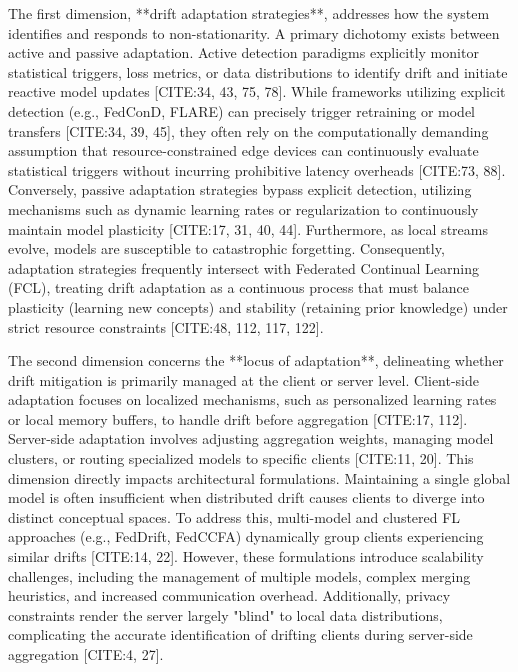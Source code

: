 \documentclass[journal]{IEEEtran}
\begin{document}
The first dimension, **drift adaptation strategies**, addresses how the system identifies and responds to non-stationarity. A primary dichotomy exists between active and passive adaptation. Active detection paradigms explicitly monitor statistical triggers, loss metrics, or data distributions to identify drift and initiate reactive model updates [CITE:34, 43, 75, 78]. While frameworks utilizing explicit detection (e.g., FedConD, FLARE) can precisely trigger retraining or model transfers [CITE:34, 39, 45], they often rely on the computationally demanding assumption that resource-constrained edge devices can continuously evaluate statistical triggers without incurring prohibitive latency overheads [CITE:73, 88]. Conversely, passive adaptation strategies bypass explicit detection, utilizing mechanisms such as dynamic learning rates or regularization to continuously maintain model plasticity [CITE:17, 31, 40, 44]. Furthermore, as local streams evolve, models are susceptible to catastrophic forgetting. Consequently, adaptation strategies frequently intersect with Federated Continual Learning (FCL), treating drift adaptation as a continuous process that must balance plasticity (learning new concepts) and stability (retaining prior knowledge) under strict resource constraints [CITE:48, 112, 117, 122].

The second dimension concerns the **locus of adaptation**, delineating whether drift mitigation is primarily managed at the client or server level. Client-side adaptation focuses on localized mechanisms, such as personalized learning rates or local memory buffers, to handle drift before aggregation [CITE:17, 112]. Server-side adaptation involves adjusting aggregation weights, managing model clusters, or routing specialized models to specific clients [CITE:11, 20]. This dimension directly impacts architectural formulations. Maintaining a single global model is often insufficient when distributed drift causes clients to diverge into distinct conceptual spaces. To address this, multi-model and clustered FL approaches (e.g., FedDrift, FedCCFA) dynamically group clients experiencing similar drifts [CITE:14, 22]. However, these formulations introduce scalability challenges, including the management of multiple models, complex merging heuristics, and increased communication overhead. Additionally, privacy constraints render the server largely "blind" to local data distributions, complicating the accurate identification of drifting clients during server-side aggregation [CITE:4, 27].
\end{document}
